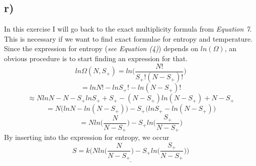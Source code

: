 \documentclass{scrartcl}
\begin{document}
\subsection*{r)}
In this exercise I will go back to the exact multiplicity formula from \textit{Equation 7}. This is necessary if we want to find exact formulae for entropy and temperature. Since the expression for entropy (\textit{see Equation (4)}) depends on $ln(\Omega)$, an obvious procedure is to start finding an expression for that.
$$ln\Omega(N,S_+)=ln\bigg(\frac{N!}{S_+!(N-S_+)!}\bigg)$$
$$=ln N!-ln S_+! - ln(N-S_+)!$$
$$\approx NlnN-N-S_+ ln S_+ + S_+ - (N-S_+)ln(N-S_+)+N-S_+$$
$$=N\Big(lnN-ln(N-S_+)\Big)-S_+\Big(lnS_+ - ln(N-S_+)\Big)$$
$$=Nln\bigg(\frac{N}{N-S_+}\bigg)-S_+ln\bigg(\frac{S_+}{N-S_+}\bigg)$$
By inserting into the expression for entropy, we occur
$$\underline{S=k\Bigg(Nln\bigg(\frac{N}{N-S_+}\bigg)-S_+ln\bigg(\frac{S_+}{N-S_+}\bigg)\Bigg)}$$
\end{document}
